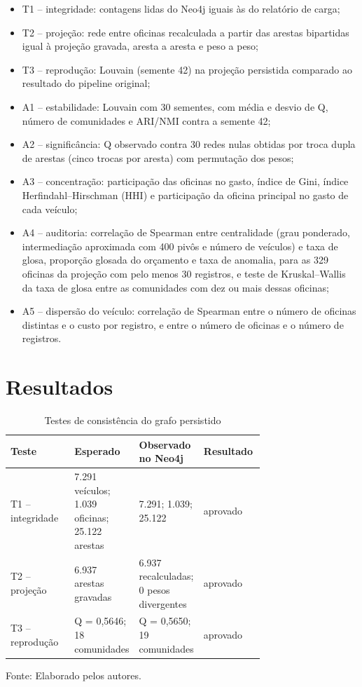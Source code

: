 \documentclass[12pt,a4paper]{article}
\begin{document}
\begin{itemize}
  \item T1 – integridade: contagens lidas do Neo4j iguais às do relatório de carga;
  \item T2 – projeção: rede entre oficinas recalculada a partir das arestas bipartidas igual à projeção gravada, aresta a aresta e peso a peso;
  \item T3 – reprodução: Louvain (semente 42) na projeção persistida comparado ao resultado do pipeline original;
  \item A1 – estabilidade: Louvain com 30 sementes, com média e desvio de Q, número de comunidades e ARI/NMI contra a semente 42;
  \item A2 – significância: Q observado contra 30 redes nulas obtidas por troca dupla de arestas (cinco trocas por aresta) com permutação dos pesos;
  \item A3 – concentração: participação das oficinas no gasto, índice de Gini, índice Herfindahl–Hirschman (HHI) e participação da oficina principal no gasto de cada veículo;
  \item A4 – auditoria: correlação de Spearman entre centralidade (grau ponderado, intermediação aproximada com 400 pivôs e número de veículos) e taxa de glosa, proporção glosada do orçamento e taxa de anomalia, para as 329 oficinas da projeção com pelo menos 30 registros, e teste de Kruskal–Wallis da taxa de glosa entre as comunidades com dez ou mais dessas oficinas;
  \item A5 – dispersão do veículo: correlação de Spearman entre o número de oficinas distintas e o custo por registro, e entre o número de oficinas e o número de registros.
\end{itemize}

\section{Resultados}
\begin{table}[ht]
\centering\small
\caption{Testes de consistência do grafo persistido}
\label{tab:t1}
\begin{tabular}{lp{0.24\linewidth}p{0.24\linewidth}p{0.24\linewidth}}
\hline
\textbf{Teste} & \textbf{Esperado} & \textbf{Observado no Neo4j} & \textbf{Resultado} \\ \hline
T1 – integridade & 7.291 veículos; 1.039 oficinas; 25.122 arestas & 7.291; 1.039; 25.122 & aprovado \\
T2 – projeção & 6.937 arestas gravadas & 6.937 recalculadas; 0 pesos divergentes & aprovado \\
T3 – reprodução & Q = 0,5646; 18 comunidades & Q = 0,5650; 19 comunidades & aprovado \\
\hline
\end{tabular}
\par\smallskip\footnotesize Fonte: Elaborado pelos autores.
\end{table}
\end{document}
